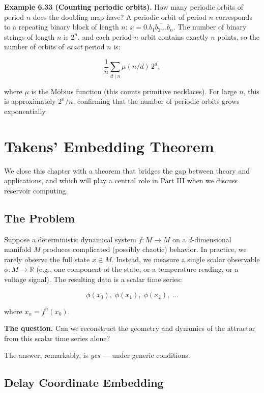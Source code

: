 \textbf{Example 6.33 (Counting periodic orbits).} How many periodic orbits of period $n$ does the doubling map have? A periodic orbit of period $n$ corresponds to a repeating binary block of length $n$: $x = 0.\overline{b_1 b_2 \ldots b_n}$. The number of binary strings of length $n$ is $2^n$, and each period-$n$ orbit contains exactly $n$ points, so the number of orbits of \textit{exact} period $n$ is:

\[
\frac{1}{n}\sum_{d \mid n} \mu(n/d) \, 2^d,
\]

where $\mu$ is the Möbius function (this counts primitive necklaces). For large $n$, this is approximately $2^n/n$, confirming that the number of periodic orbits grows exponentially.


\bigskip


\section{Takens' Embedding Theorem}\label{sec:6.7}

We close this chapter with a theorem that bridges the gap between theory and applications, and which will play a central role in Part III when we discuss reservoir computing.

\subsection{The Problem}\label{sec:6.7.1}

Suppose a deterministic dynamical system $f: M \to M$ on a $d$-dimensional manifold $M$ produces complicated (possibly chaotic) behavior. In practice, we rarely observe the full state $x \in M$. Instead, we measure a single scalar observable $\phi: M \to \mathbb{R}$ (e.g., one component of the state, or a temperature reading, or a voltage signal). The resulting data is a scalar time series:

\[
\phi(x_0), \; \phi(x_1), \; \phi(x_2), \; \ldots
\]

where $x_n = f^n(x_0)$.

\textbf{The question.} Can we reconstruct the geometry and dynamics of the attractor from this scalar time series alone?

The answer, remarkably, is \textit{yes} --- under generic conditions.

\subsection{Delay Coordinate Embedding}\label{sec:6.7.2}


